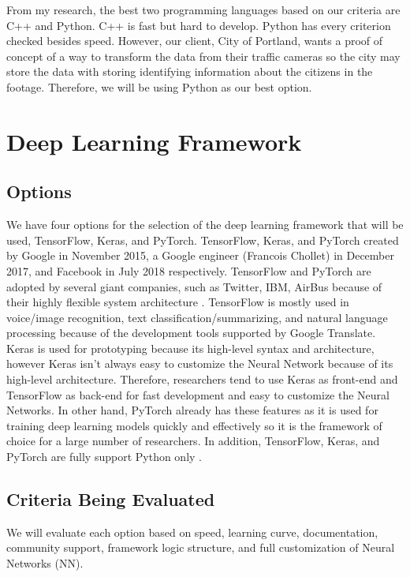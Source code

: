 \documentclass[onecolumn, draftclsnofoot,10pt, compsoc]{IEEEtran}
\begin{document}
From my research, the best two programming languages based on our criteria are C++ and Python. C++ is fast but hard to develop. Python has every criterion checked besides speed. However, our client, City of Portland, wants a proof of concept of a way to transform the data from their traffic cameras so the city may store the data with storing identifying information about the citizens in the footage. Therefore, we will be using Python as our best option.

\section{Deep Learning Framework}

\subsection{Options}
We have four options for the selection of the deep learning framework that will be used, TensorFlow, Keras, and PyTorch. TensorFlow, Keras, and PyTorch created by Google in November 2015, a Google engineer (Francois Chollet) in December 2017, and Facebook in July 2018 respectively. TensorFlow and PyTorch are adopted by several giant companies, such as Twitter, IBM, AirBus because of their highly flexible system architecture \cite{dlf1}. TensorFlow is mostly used in voice/image recognition, text classification/summarizing, and natural language processing because of the development tools supported by Google Translate. Keras is used for prototyping because its high-level syntax and architecture, however Keras isn't always easy to customize the Neural Network because of its high-level architecture. Therefore, researchers tend to use Keras as front-end and TensorFlow as back-end for fast development and easy to customize the Neural Networks. In other hand, PyTorch already has these features as it is used for training deep learning models quickly and effectively so it is the framework of choice for a large number of researchers. In addition, TensorFlow, Keras, and PyTorch are fully support Python only \cite{dlf2}.

\subsection{Criteria Being Evaluated}
We will evaluate each option based on speed, learning curve, documentation, community support, framework logic structure, and full customization of Neural Networks (NN).
\end{document}
